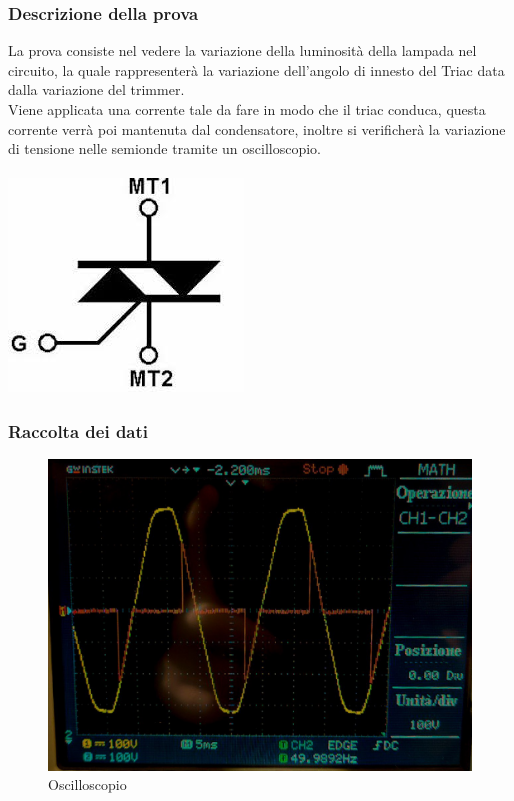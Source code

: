 \documentclass[12pt]{article}
\begin{document}
        \subsubsection{Descrizione della prova}
        La prova consiste nel vedere la variazione della luminosità della lampada nel circuito, la quale rappresenterà la variazione dell’angolo di innesto del Triac data dalla variazione del trimmer.\\
Viene applicata una corrente tale da fare in modo che il triac conduca, questa corrente verrà poi mantenuta dal condensatore, inoltre si verificherà la variazione di tensione nelle semionde tramite un oscilloscopio.\\
\\
    \includegraphics[scale=0.4]{triac}

        \subsubsection{Raccolta dei dati}
        \begin{figure}[|h]
            \centering
            \includegraphics[scale=0.12]{oscilloscopio.jpg}
            \caption{Oscilloscopio}
            \label{fig:Oscilloscopio}
        \end{figure}
\end{document}
